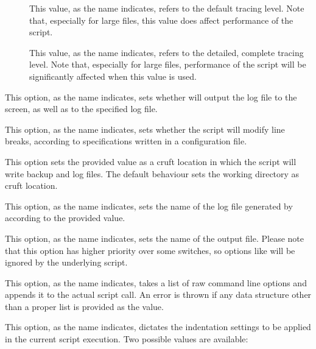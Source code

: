 \begin{description}
\begin{description}
\begin{description}
\item[] This value, as the name indicates, refers to the default tracing level. Note that, especially for large files, this value does affect performance of the script.

\item[] This value, as the name indicates, refers to the detailed, complete tracing level. Note that, especially for large files, performance of the script will be significantly affected when this value is used.
\end{description}

\item[\rpsbox{screenlog}] This option, as the name indicates, sets whether  will output the log file to the screen, as well as to the specified log file.

\item[\rpsbox{modifylinebreaks}] This option, as the name indicates, sets whether the script will modify line breaks, according to specifications written in a configuration file.

\item[\abox{cruft}] This option sets the provided value as a cruft location in which the script will write backup and log files. The default behaviour sets the working directory as cruft location.

\item[\abox{logfile}] This option, as the name indicates, sets the name of the log file generated by  according to the provided value.

\item[\abox{output}] This option, as the name indicates, sets the name of the output file. Please note that this option has higher priority over some switches, so options like  will be ignored by the underlying script.

\item[\abox{options}] This option, as the name indicates, takes a list of raw command line options and appends it to the actual script call. An error is thrown if any data structure other than a proper list is provided as the value.

\item[\abox{settings}] This option, as the name indicates, dictates the indentation settings to be applied in the current script execution. Two possible values are available:


\end{description}
\end{description}
